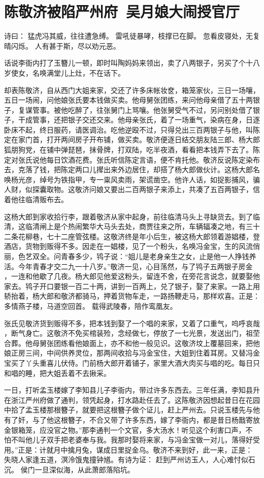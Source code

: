 \chapter{陈敬济被陷严州府~吴月娘大闹授官厅}

诗曰：
猛虎冯其威，往往遭急缚。
雷吼徒暴哮，枝撑已在脚。
忽看皮寝处，无复晴闪烁。
人有甚于斯，尽以劝元恶。

话说李衙内打了玉簪儿一顿，即时叫陶妈妈来领出，卖了八两银子，另买了个十八
岁使女，名唤满堂儿上灶，不在话下。

却表陈敬济，自从西门大姐来家，交还了许多床帐妆奁，箱笼家伙，三日一场嚷，
五日一场闹，问他娘张氏要本钱做买卖。他母舅张团练，来问他母亲借了五十两银
子，复谋管事。被他吃醉了，往张舅门上骂嚷。他张舅受气不过，另问别处借了银
子，干成管事，还把银子交还交来。他母亲张氏，着了一场重气，染病在身，日逐
卧床不起，终日服药，请医调治。吃他逆殴不过，只得兑出三百两银子与他，叫陈
定在家门首，打开两间房子开布铺，做买卖。敬济便逐日结交朋友陆三郎、杨大郎
狐朋狗党，在铺中弹琵琶，抹骨牌，打双陆，吃半夜酒，看看把本钱弄下去了。陈
定对张氏说他每日饮酒花费。张氏听信陈定言语，便不肯托他。敬济反说陈定染布
去，克落了钱，把陈定两口儿撵出来外边居住，却搭了杨大郎做伙计。这杨大郎名
唤杨光彦，绰号为铁指甲，专一粜风卖雨，架谎凿空。他许人话，如捉影捕风，骗
人财，似探囊取物。这敬济问娘又要出二百两银子来添上，共凑了五百两银子，信
着他往临清贩布去。

这杨大郎到家收拾行李，跟着敬济从家中起身，前往临清马头上寻缺货去。到了临
清，这临清闸上是个热闹繁华大马头去处，商贾往来之所，车辆辐凑之地，有三十
二条花柳巷，七十二座管弦楼。这敬济终是年小后生，被这杨大郎领着游娼楼，登
酒店，货物到贩得不多。因走在一娼楼，见了一个粉头，名唤冯金宝，生的风流俏
丽，色艺双全。问青春多少，鸨子说：“姐儿是老身亲生之女，止是他一人挣钱养
活。今年青春才交二九一十八岁。”敬济一见，心目荡然，与了鸨子五两银子房金
，一连和他歇了几夜。杨大郎见他爱这粉头，留连不舍，在旁花言说念，就要娶他
家去。鸨子开口要银一百二十两，讲到一百两上，兑了银子，娶了来家。一路上用
轿抬着，杨大郎和敬济都骑马，押着货物车走，一路扬鞭走马，那样欢喜。正是：
多情燕子楼，马道空回首。
载得武陵春，陪作鸾凰友。

张氏见敬济货到贩得不多，把本钱到娶了一个唱的来家，又着了口重气，呜呼哀哉
，断气身亡。这敬济不免买棺装殓，念经做七，停放了一七光景，发送出门，祖茔
合葬。他母舅张团练看他娘面上，亦不和他一般见识。这敬济坟上覆墓回来，把他
娘正房三间，中间供养灵位，那两间收拾与冯金宝住，大姐到住着耳房。又替冯金
宝买了丫头重喜儿伏侍。门前杨大郎开着铺子，家里大酒大肉买与唱的吃。每日只
和唱的睡，把大姐丢着不去揪采。

一日，打听孟玉楼嫁了李知县儿子李衙内，带过许多东西去。三年任满，李知县升
在浙江严州府做了通判，领凭起身，打水路赴任去了。这陈敬济因想起昔日在花园
中拾了孟玉楼那根簪子，就要把这根簪子做个证儿，赶上严州去。只说玉楼先与他
有了奸，与了他这根簪子，不合又带了许多东西，嫁了李衙内，都是昔日杨戬寄放
金银箱笼，应没官之物。”那李通判一个文官，多大汤水！听见这个利害口声，不
怕不叫他儿子双手把老婆奉与我。我那时娶将来家，与冯金宝做一对儿，落得好受
用。”正是：计就月中擒月兔，谋成日里捉金乌。敬济不来到好，此一来，正是：
失晓人家逢五道，溟泠饿鬼撞钟馗。有诗为证：
赶到严州访玉人，人心难忖似石沉。
侯门一旦深似海，从此萧郎落陷坑。

